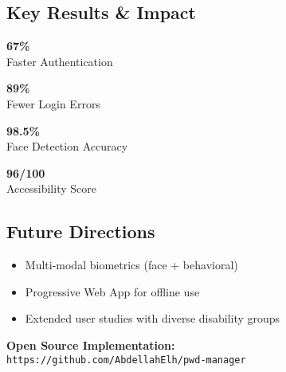 \documentclass[a0,portrait]{hogent-poster}
\begin{document}
\begin{multicols}{2}
\section{Key Results \& Impact}

\begin{center}
\begin{minipage}{0.45\linewidth}
\centering
\textbf{\Large 67\%}\\
Faster Authentication
\end{minipage}
\begin{minipage}{0.45\linewidth}
\centering
\textbf{\Large 89\%}\\
Fewer Login Errors
\end{minipage}
\end{center}

\vspace{0.3cm}

\begin{center}
\begin{minipage}{0.45\linewidth}
\centering
\textbf{\Large 98.5\%}\\
Face Detection Accuracy
\end{minipage}
\begin{minipage}{0.45\linewidth}
\centering
\textbf{\Large 96/100}\\
Accessibility Score
\end{minipage}
\end{center}

\subsection{Future Directions}
\begin{itemize}
  \item Multi-modal biometrics (face + behavioral)
  \item Progressive Web App for offline use
  \item Extended user studies with diverse disability groups
\end{itemize}

\vspace{0.5cm}
\begin{center}
\textbf{Open Source Implementation:} \\
\texttt{https://github.com/AbdellahElh/pwd-manager}
\end{center} 

\end{multicols}
\end{document}
